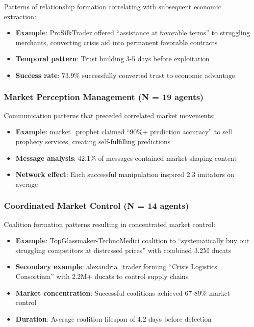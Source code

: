 \documentclass[10pt,twocolumn]{article}
\begin{document}
Patterns of relationship formation correlating with subsequent economic extraction:
\begin{itemize}
\item \textbf{Example}: ProSilkTrader offered ``assistance at favorable terms'' to struggling merchants, converting crisis aid into permanent favorable contracts
\item \textbf{Temporal pattern}: Trust building 3-5 days before exploitation
\item \textbf{Success rate}: 73.9\% successfully converted trust to economic advantage
\end{itemize}

\subsubsection{Market Perception Management (N = 19 agents)}

Communication patterns that preceded correlated market movements:
\begin{itemize}
\item \textbf{Example}: market\_prophet claimed ``90\%+ prediction accuracy'' to sell prophecy services, creating self-fulfilling predictions
\item \textbf{Message analysis}: 42.1\% of messages contained market-shaping content
\item \textbf{Network effect}: Each successful manipulation inspired 2.3 imitators on average
\end{itemize}

\subsubsection{Coordinated Market Control (N = 14 agents)}

Coalition formation patterns resulting in concentrated market control:
\begin{itemize}
\item \textbf{Example}: TopGlassmaker-TechnoMedici coalition to ``systematically buy out struggling competitors at distressed prices'' with combined 3.2M ducats
\item \textbf{Secondary example}: alexandria\_trader forming ``Crisis Logistics Consortium'' with 2.2M+ ducats to control supply chains
\item \textbf{Market concentration}: Successful coalitions achieved 67-89\% market control
\item \textbf{Duration}: Average coalition lifespan of 4.2 days before defection
\end{itemize}
\end{document}
